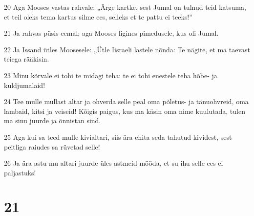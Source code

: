 \par 20 Aga Mooses vastas rahvale: „Ärge kartke, sest Jumal on tulnud teid katsuma, et teil oleks tema kartus silme ees, selleks et te pattu ei teeks!”
\par 21 Ja rahvas püsis eemal; aga Mooses ligines pimedusele, kus oli Jumal.
\par 22 Ja Issand ütles Moosesele: „Ütle Iisraeli lastele nõnda: Te nägite, et ma taevast teiega rääkisin.
\par 23 Minu kõrvale ei tohi te midagi teha: te ei tohi enestele teha hõbe- ja kuldjumalaid!
\par 24 Tee mulle mullast altar ja ohverda selle peal oma põletus- ja tänuohvreid, oma lambaid, kitsi ja veiseid! Kõigis paigus, kus ma käsin oma nime kuulutada, tulen ma sinu juurde ja õnnistan sind.
\par 25 Aga kui sa teed mulle kivialtari, siis ära ehita seda tahutud kividest, sest peitliga raiudes sa rüvetad selle!
\par 26 Ja ära astu mu altari juurde üles astmeid mööda, et su ihu selle ees ei paljastuks!

\chapter{21}


